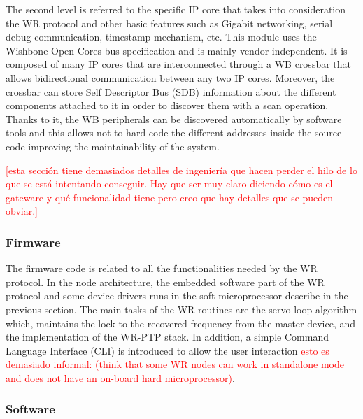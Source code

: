 The second level is referred to the specific IP core that takes into 
consideration the WR protocol and other basic features such as Gigabit 
networking, serial debug communication, timestamp mechanism, etc. This module 
uses the Wishbone Open Cores bus specification and is mainly 
vendor-independent. It is composed of many IP cores that are interconnected 
through a WB crossbar that allows bidirectional communication between any two 
IP cores. Moreover, the crossbar can store Self Descriptor Bus (SDB) 
information about the different components attached to it in order to discover 
them with a scan operation. Thanks to it, the WB peripherals can be discovered 
automatically by software tools and this allows not to hard-code the different 
addresses inside the source code improving the maintainability of the system. 

\textcolor{red}{[esta sección tiene demasiados detalles de ingeniería que hacen perder el hilo de lo que se está intentando conseguir. Hay que ser muy claro diciendo cómo es el gateware y qué funcionalidad tiene pero creo que hay detalles que se pueden obviar.]}

\subsubsection{Firmware} \label{subsec:firmware}

The firmware code is related to all the functionalities needed by the WR protocol. In the node architecture, the embedded software part of the WR 
protocol and some device drivers runs in the soft-microprocessor describe in 
the previous section. The main tasks of the WR routines are the servo 
loop algorithm which, maintains the lock to the recovered frequency from the 
master device, and the implementation of the WR-PTP stack. In addition, a 
simple Command Language Interface (CLI) is introduced to allow 
the user interaction \textcolor{red}{esto es demasiado informal: (think that some WR nodes can work in standalone mode and 
does not have an on-board hard microprocessor)}.

\subsubsection{Software} \label{subsec:software}

